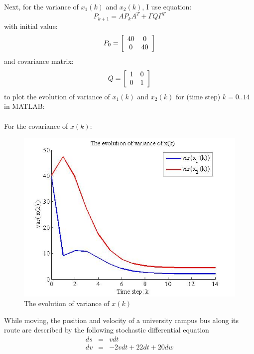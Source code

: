 \documentclass{article}
\begin{document}
Next, for the variance of $x_1(k)$ and $x_2(k)$, I use equation:\\
\begin{equation}
	P_{k + 1}  = AP_k A^T  + \Gamma Q\Gamma ^T 
\end{equation}
with initial value:\\
\begin{equation}
	P_0  = \left[ {\begin{array}{*{20}c}
	   {40} & 0  \\
	   0 & {40}  \\
	\end{array}} \right]
\end{equation}
and covariance matrix:
\begin{equation}
	Q = \left[ {\begin{array}{*{20}c}
	   1 & 0  \\
	   0 & 1  \\
	\end{array}} \right]
\end{equation}
to plot the evolution of variance of $x_1(k)$ and $x_2(k)$ for (time step) $k=0..14$ in MATLAB:\\\\
For the covariance of $x(k)$:
\begin{figure}[H]
\begin{center}
	\includegraphics[scale=0.5]{figure/hw4_varx12.jpg}
	\caption{The evolution of variance of $ x(k) $}
\end{center}
\end{figure}


 While moving, the position and velocity of a university campus bus along its route are described by the following stochastic differential equation
\begin{eqnarray}
  ds &=& vdt \\
  dv &=& -2vdt+22dt+20dw 
\end{eqnarray}
\end{document}
